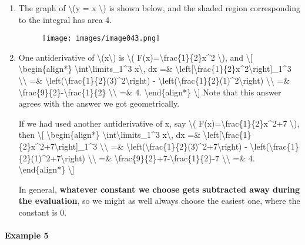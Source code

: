 \begin{enumerate}
\item
  The graph of \textbackslash{}(y = x \textbackslash{}) is shown below,
  and the shaded region corresponding to the integral has area 4.

  \begin{figure}
  \centering
  \texttt{[image: images/image043.png]}
  \caption{}
  \end{figure}
\item
  One antiderivative of \textbackslash{}(x\textbackslash{}) is
  \textbackslash{}( F(x)=\textbackslash{}frac\{1\}\{2\}x\^{}2
  \textbackslash{}), and \textbackslash{}{[}
  \textbackslash{}begin\{align*\}
  \textbackslash{}int\textbackslash{}limits\_1\^{}3 x\textbackslash{},
  dx =\&
  \textbackslash{}left{[}\textbackslash{}frac\{1\}\{2\}x\^{}2\textbackslash{}right{]}\_1\^{}3
  \textbackslash{}\textbackslash{} =\&
  \textbackslash{}left(\textbackslash{}frac\{1\}\{2\}(3)\^{}2\textbackslash{}right)
  -
  \textbackslash{}left(\textbackslash{}frac\{1\}\{2\}(1)\^{}2\textbackslash{}right)
  \textbackslash{}\textbackslash{} =\&
  \textbackslash{}frac\{9\}\{2\}-\textbackslash{}frac\{1\}\{2\}
  \textbackslash{}\textbackslash{} =\& 4. \textbackslash{}end\{align*\}
  \textbackslash{}{]} Note that this answer agrees with the answer we
  got geometrically.

  If we had used another antiderivative of x, say \textbackslash{}(
  F(x)=\textbackslash{}frac\{1\}\{2\}x\^{}2+7 \textbackslash{}), then
  \textbackslash{}{[} \textbackslash{}begin\{align*\}
  \textbackslash{}int\textbackslash{}limits\_1\^{}3 x\textbackslash{},
  dx =\&
  \textbackslash{}left{[}\textbackslash{}frac\{1\}\{2\}x\^{}2+7\textbackslash{}right{]}\_1\^{}3
  \textbackslash{}\textbackslash{} =\&
  \textbackslash{}left(\textbackslash{}frac\{1\}\{2\}(3)\^{}2+7\textbackslash{}right)
  -
  \textbackslash{}left(\textbackslash{}frac\{1\}\{2\}(1)\^{}2+7\textbackslash{}right)
  \textbackslash{}\textbackslash{} =\&
  \textbackslash{}frac\{9\}\{2\}+7-\textbackslash{}frac\{1\}\{2\}-7
  \textbackslash{}\textbackslash{} =\& 4. \textbackslash{}end\{align*\}
  \textbackslash{}{]}

  In general, \textbf{whatever constant we choose gets subtracted away
  during the evaluation}, so we might as well always choose the easiest
  one, where the constant is 0.
\end{enumerate}

\hypertarget{example-5}{%
\paragraph{Example 5}\label{example-5}}

